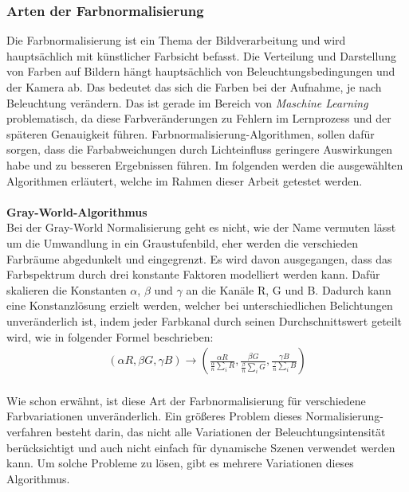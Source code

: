 \documentclass[a4paper,12pt,oneside]{article}
\begin{document}
    \subsubsection{Arten der Farbnormalisierung}\label{s.farbnormalisierungen}
  Die Farbnormalisierung ist ein Thema der Bildverarbeitung und wird hauptsächlich mit künstlicher Farbsicht befasst. Die Verteilung und Darstellung von Farben auf Bildern hängt hauptsächlich von Beleuchtungsbedingungen und der Kamera ab. Das bedeutet das sich die Farben bei der Aufnahme, je nach Beleuchtung verändern. Das ist gerade im Bereich von \textit{Maschine Learning} problematisch, da diese Farbveränderungen zu Fehlern im Lernprozess und der späteren Genauigkeit führen. Farbnormalisierung-Algorithmen, sollen dafür sorgen, dass die Farbabweichungen durch Lichteinfluss geringere Auswirkungen habe und zu besseren Ergebnissen führen. Im folgenden werden die ausgewählten Algorithmen erläutert, welche im Rahmen dieser Arbeit getestet werden.\\\\
  \textbf{Gray-World-Algorithmus}\label{s.gw}\\
  Bei der Gray-World Normalisierung geht es nicht, wie der Name vermuten lässt um die Umwandlung in ein Graustufenbild, eher werden die verschieden Farbräume abgedunkelt und eingegrenzt. Es wird davon ausgegangen, dass das Farbspektrum durch drei konstante Faktoren modelliert werden kann. Dafür skalieren die Konstanten $\alpha$, $\beta$ und $\gamma$ an die Kanäle R, G und B. Dadurch kann eine Konstanzlösung erzielt werden, welcher bei unterschiedlichen Belichtungen unveränderlich ist, indem jeder Farbkanal durch seinen Durchschnittswert geteilt wird, wie in folgender Formel beschrieben:\\
  \begin{eqnarray} (\alpha R, \beta G, \gamma B) \rightarrow\left(\frac{\alpha R} {\frac{\alpha}{n} \sum_{i} R}, \frac{\beta G} {\frac{\beta}{n} \sum_{i} G}, \frac{\gamma B} {\frac{\gamma}{n} \sum_{i} B} \right) \end{eqnarray}\\
  Wie schon erwähnt, ist diese Art der Farbnormalisierung für verschiedene Farbvariationen unveränderlich. Ein größeres Problem dieses Normalisierung-verfahren besteht darin, das nicht alle Variationen der Beleuchtungsintensität berücksichtigt und auch nicht einfach für dynamische Szenen verwendet werden kann. Um solche Probleme zu lösen, gibt es mehrere Variationen dieses Algorithmus.\\\\
\end{document}
